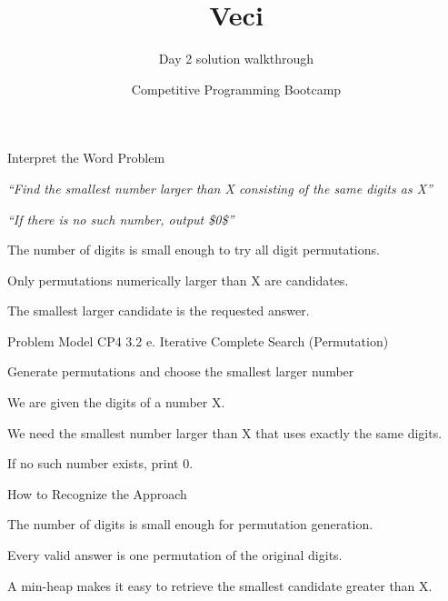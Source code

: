 \documentclass[aspectratio=169,11pt]{beamer}
\title[veci]{Veci}
\subtitle{Day 2 solution walkthrough}
\author[Solution Deck]{Competitive Programming Bootcamp}
\date{}
\begin{document}
\begin{frame}[plain]
  \titlepage
\end{frame}

\begin{frame}{Interpret the Word Problem}
\small
{}
\begin{tightitemize}
  \item \textit{``Find the smallest number larger than X consisting of the same digits as X''}
  \item \textit{``If there is no such number, output \$0\$''}
\end{tightitemize}

\vspace{0.18cm}
\begin{tightitemize}
  \item The number of digits is small enough to try all digit permutations.
  \item Only permutations numerically larger than X are candidates.
  \item The smallest larger candidate is the requested answer.
\end{tightitemize}
\end{frame}







\begin{frame}{Problem Model}
\small
{} CP4 3.2 e. Iterative Complete Search (Permutation)

\vspace{0.25cm}
 Generate permutations and choose the smallest larger number

\vspace{0.25cm}
\begin{tightitemize}
  \item We are given the digits of a number X.
  \item We need the smallest number larger than X that uses exactly the same digits.
  \item If no such number exists, print 0.
\end{tightitemize}
\end{frame}

\begin{frame}{How to Recognize the Approach}
\begin{tightitemize}
  \item The number of digits is small enough for permutation generation.
  \item Every valid answer is one permutation of the original digits.
  \item A min-heap makes it easy to retrieve the smallest candidate greater than X.
\end{tightitemize}
\end{frame}
\end{document}
